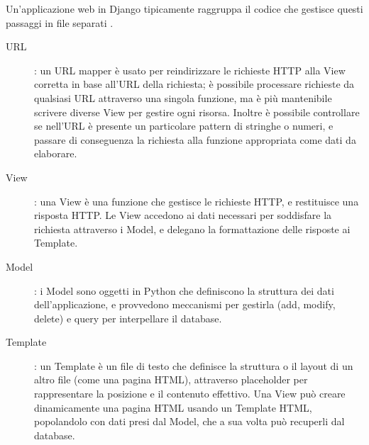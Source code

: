 \hfill\break
Un'applicazione web in Django tipicamente raggruppa il codice che gestisce questi passaggi in file separati \cite{mdn-django-documentation}.
\begin{description}
    \item[URL]: un URL mapper è usato per reindirizzare le richieste HTTP alla View corretta in base all'URL della richiesta; è possibile processare 
    richieste da qualsiasi URL attraverso una singola funzione, ma è più mantenibile scrivere diverse View per gestire ogni risorsa.
    Inoltre è possibile controllare se nell'URL è presente un particolare pattern di stringhe o numeri, e passare di conseguenza la richiesta alla funzione appropriata
    come dati da elaborare.
    \item[View]: una View è una funzione che gestisce le richieste HTTP, e restituisce una risposta HTTP. Le View accedono ai dati necessari per soddisfare la 
    richiesta attraverso i Model, e delegano la formattazione delle risposte ai Template. 
    \item[Model]: i Model sono oggetti in Python che definiscono la struttura dei dati dell'applicazione, e provvedono meccanismi per gestirla (add, modify, 
    delete) e query per interpellare il database.
    \item[Template]: un Template è un file di testo che definisce la struttura o il layout di un altro file (come una pagina HTML), attraverso placeholder per
    rappresentare la posizione e il contenuto effettivo. Una View può creare dinamicamente una pagina HTML usando un Template HTML, popolandolo con dati presi dal Model, 
    che a sua volta può recuperli dal database.
\end{description}
%
